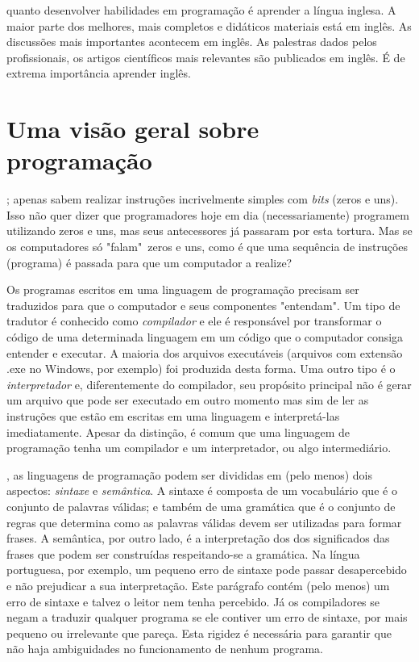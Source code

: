 \documentclass[justified]{tufte-handout}
\begin{document}
 quanto desenvolver habilidades em programação é aprender a língua inglesa. A maior parte dos melhores, mais completos e didáticos materiais está em inglês. As discussões mais importantes acontecem em inglês. As palestras dados pelos profissionais, os artigos científicos mais relevantes são publicados em inglês. É de extrema importância aprender inglês.

\section{Uma visão geral sobre programação}

; apenas sabem realizar instruções incrivelmente simples com \emph{bits} (zeros e uns). Isso não quer dizer que programadores hoje em dia (necessariamente) programem utilizando zeros e uns, mas seus antecessores já passaram por esta tortura. Mas se os computadores só "falam"~zeros e uns, como é que uma sequência de instruções (programa) é passada para que um computador a realize?

Os programas escritos em uma linguagem de programação precisam ser traduzidos para que o computador e seus componentes "entendam". Um tipo de tradutor é conhecido como \emph{compilador} e ele é responsável por transformar o código de uma determinada linguagem em um código que o computador consiga entender e executar. A maioria dos arquivos executáveis (arquivos com extensão .exe no Windows, por exemplo) foi produzida desta forma. Uma outro tipo é o \emph{interpretador} e, diferentemente do compilador, seu propósito principal não é gerar um arquivo que pode ser executado em outro momento mas sim de ler as instruções que estão em escritas em uma linguagem e interpretá-las imediatamente. Apesar da distinção, é comum que uma linguagem de programação tenha um compilador e um interpretador, ou algo intermediário.

, as linguagens de programação podem ser divididas em (pelo menos) dois aspectos: \emph{sintaxe} e \emph{semântica}. A sintaxe é composta de um vocabulário que é o conjunto de palavras válidas; e também de uma gramática que é o conjunto de regras que determina como as palavras válidas devem ser utilizadas para formar frases. A semântica, por outro lado, é a interpretação dos dos significados das frases que podem ser construídas respeitando-se a gramática. Na língua portuguesa, por exemplo, um pequeno erro de sintaxe pode passar desapercebido e não prejudicar a sua interpretação. Este parágrafo contém (pelo menos) um erro de sintaxe e talvez o leitor nem tenha percebido. Já os compiladores se negam a traduzir qualquer programa se ele contiver um erro de sintaxe, por mais pequeno ou irrelevante que pareça. Esta rigidez é necessária para garantir que não haja ambiguidades no funcionamento de nenhum programa.
\end{document}
